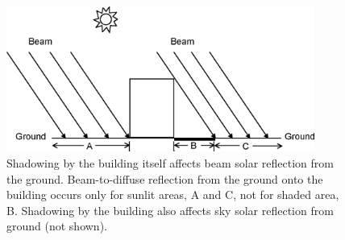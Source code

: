 \begin{figure}[hbtp] %
\centering
\includegraphics[width=0.9\textwidth, height=0.9\textheight, keepaspectratio=true]{media/image672.png}
\caption{Shadowing by the building itself affects beam solar reflection from the ground. Beam-to-diffuse reflection from the ground onto the building occurs only for sunlit areas, A and C, not for shaded area, B. Shadowing by the building also affects sky solar reflection from ground (not shown). \protect \label{fig:shadowing-by-the-building-itself-affects-beam}}
\end{figure}
